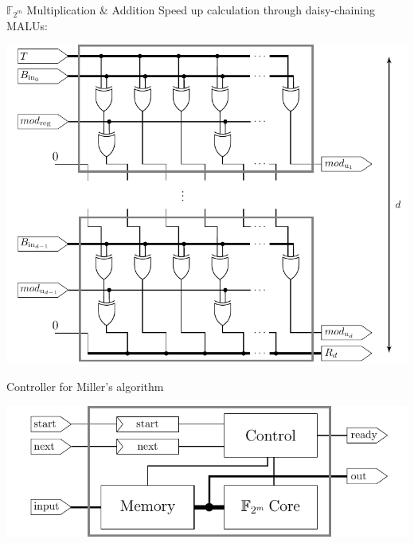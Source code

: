 \documentclass[svgnames]{beamer}
\newenvironment{changemargin}[2]{%
\begin{list}{}{%
\setlength{\topsep}{0pt}%
\setlength{\leftmargin}{#1}%
\setlength{\rightmargin}{#2}%
\setlength{\listparindent}{\parindent}%
\setlength{\itemindent}{\parindent}%
\setlength{\parsep}{\parskip}%
}%
\item[]}{\end{list}}
\begin{document}
\begin{frame}{$\mathbb{F}_{2^m}$ Multiplication \& Addition}
	Speed up calculation through daisy-chaining MALUs:\\[0.7em]
	\begin{changemargin}{-1cm}{-1cm}
	\begin{center}\includegraphics[height=0.6\paperheight]{images/malu-width-d}\end{center}
	\end{changemargin}
\end{frame}

\begin{frame}{Controller for Miller's algorithm}
\vfill
	\begin{changemargin}{-4cm}{-4cm}
		\begin{center}\includegraphics[width=1\paperwidth]{images/controller-miller}\end{center}
	\end{changemargin}
\vfill
\end{frame}
\end{document}
